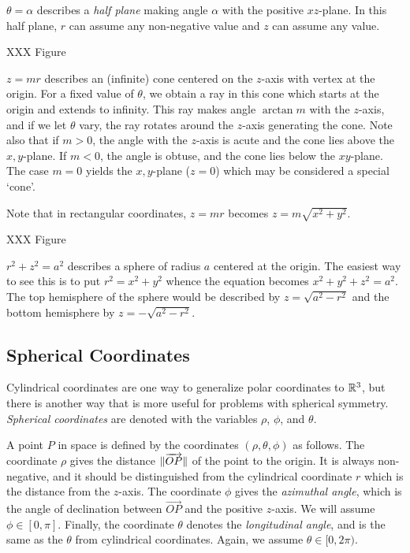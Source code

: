 \begin{example}$\theta = \alpha$ describes a \emph{half
plane} making angle $\alpha$ with the positive $xz$-plane.
In this half plane, $r$ can assume any non-negative
value and $z$ can assume any value.

XXX Figure
\end{example}
\begin{example}  $z = mr$  describes an (infinite)
  cone centered
on the $z$-axis with vertex at the origin.  For a fixed value
of $\theta$, we obtain a ray in this cone which starts at
the origin and extends to infinity.  This ray makes angle
$\arctan m$ with the $z$-axis, and if we let $\theta$
vary, the ray rotates around the $z$-axis generating the
cone.  Note also that if $m > 0$, the angle with the $z$-axis
is acute and the cone lies above the $x,y$-plane.  If
$m < 0$, the angle is obtuse, and the cone lies below the
$xy$-plane.  The case $m = 0$ yields the $x,y$-plane
($z = 0$) which may be considered a special `cone'.

Note that in rectangular coordinates,  $z = mr$ becomes
$z = m\sqrt{x^2 + y^2}$.

XXX Figure
\end{example}

\begin{example}  $r^2 + z^2 = a^2$ describes a sphere
of radius $a$ centered at the origin.  The easiest way to
see this is to put $r^2 = x^2 + y^2$ whence the equation
becomes $x^2 + y^2 + z^2 = a^2$.  The top hemisphere of the
sphere would be described by $z = \sqrt{a^2 - r^2}$
and the bottom hemisphere by
 $z = -\sqrt{a^2 - r^2}$.
\end{example}


\subsection{Spherical Coordinates}

Cylindrical coordinates are one way to generalize polar coordinates
to $\mathbb{R}^3$, but there is another way that is more useful for
problems with spherical symmetry. 
\emph{Spherical
coordinates}
are denoted with the variables $\rho$, $\phi$, and $\theta$.

A point $P$ in space is defined by the coordinates $(\rho,\theta,\phi)$ as follows.   
The coordinate $\rho$ gives the distance
$\lVert\overrightarrow{OP}\rVert$ of the point
to the origin.  It is always non-negative, and it should be
distinguished from the cylindrical coordinate $r$ which is the
distance from the $z$-axis.  The coordinate $\phi$ gives
the \emph{azimuthal angle}, which
is the angle of declination between $\overrightarrow{OP}$ and the positive $z$-axis.
We will assume $\phi\in[0,\pi]$.  Finally, the coordinate $\theta$
denotes the \emph{longitudinal angle},
and is the same as the $\theta$ from cylindrical coordinates.
Again, we assume $\theta\in[0,2\pi)$.


